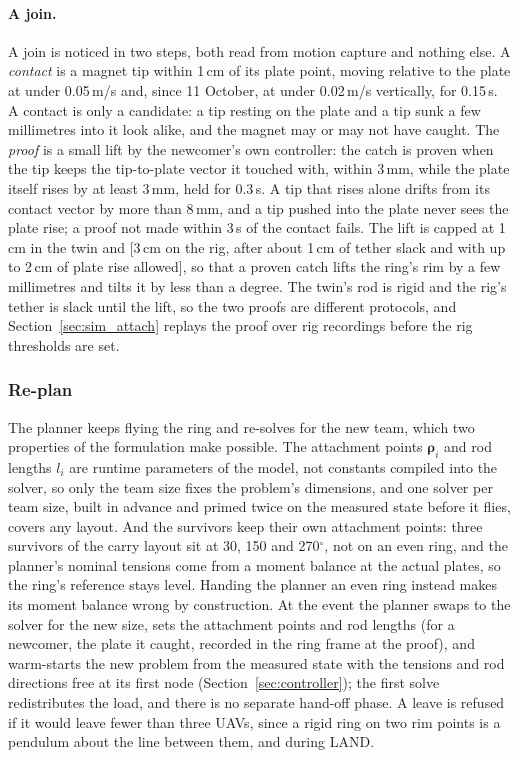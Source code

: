 \paragraph{A join.} A join is noticed in two steps, both read from motion capture and nothing else. A \emph{contact}
is a magnet tip within 1\,cm of its plate point, moving relative to the plate at under 0.05\,m/s and, since
11 October, at under 0.02\,m/s vertically, for 0.15\,s. A contact is only a candidate: a tip resting on the plate
and a tip sunk a few millimetres into it look alike, and the magnet may or may not have caught. The \emph{proof}
is a small lift by the newcomer's own controller: the catch is proven when the tip keeps the tip-to-plate vector it
touched with, within 3\,mm, while the plate itself rises by at least 3\,mm, held for 0.3\,s. A tip that rises alone
drifts from its contact vector by more than 8\,mm, and a tip pushed into the plate never sees the plate rise; a proof
not made within 3\,s of the contact fails. The lift is capped at 1\,cm in the twin and [3\,cm on the rig, after
about 1\,cm of tether slack and with up to 2\,cm of plate rise allowed], so that a proven catch lifts the ring's rim
by a few millimetres and tilts it by less than a degree. The twin's rod is rigid and the rig's tether is slack until
the lift, so the two proofs are different protocols, and Section~\ref{sec:sim_attach} replays the proof over rig
recordings before the rig thresholds are set.

\subsubsection{Re-plan}

The planner keeps flying the ring and re-solves for the new team, which two properties of the formulation make
possible. The attachment points $\boldsymbol{\rho}_i$ and rod lengths $l_i$ are runtime parameters of the model, not
constants compiled into the solver, so only the team size fixes the problem's dimensions, and one solver per team
size, built in advance and primed twice on the measured state before it flies, covers any layout. And the
survivors keep their own attachment points: three survivors of the carry layout sit at 30, 150 and 270$^\circ$, not
on an even ring, and the planner's nominal tensions come from a moment balance at the actual plates, so the ring's
reference stays level. Handing the planner an even ring instead makes its moment balance wrong by construction.
At the event the planner swaps to the solver for the new size, sets the attachment points and rod lengths (for a
newcomer, the plate it caught, recorded in the ring frame at the proof), and warm-starts the new problem from the
measured state with the tensions and rod directions free at its first node (Section~\ref{sec:controller}); the
first solve redistributes the load, and there is no separate hand-off phase. A leave is refused if it would leave
fewer than three UAVs, since a rigid ring on two rim points is a pendulum about the line between them, and during
LAND.

